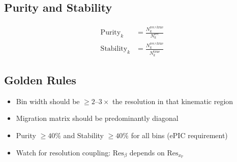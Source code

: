 \documentclass[11pt,a4paper]{article}
\begin{document}
\subsection{Purity and Stability}
\begin{align}
    \text{Purity}_k &= \frac{N^{\text{rec}\land\text{true}}_k}{N^{\text{rec}}_k} \\[0.5em]
    \text{Stability}_k &= \frac{N^{\text{rec}\land\text{true}}_k}{N^{\text{true}}_k}
\end{align}

\subsection{Golden Rules}
\begin{itemize}
    \item Bin width should be $\geq 2$--$3\times$ the resolution in that kinematic region
    \item Migration matrix should be predominantly diagonal
    \item Purity $\geq 40\%$ and Stability $\geq 40\%$ for all bins (ePIC requirement)
    \item Watch for resolution coupling: $\text{Res}_\beta$ depends on $\text{Res}_{x_\mathbb{P}}$
\end{itemize}
\end{document}
